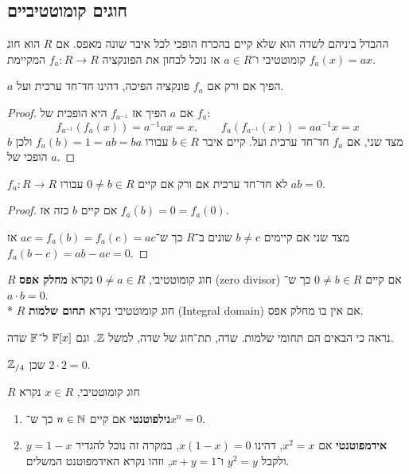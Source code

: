 \subsection{חוגים קומוטטיביים}
ההבדל ביניהם לשדה הוא שלא קיים בהכרח הופכי לכל איבר שונה מאפס.
אם $R$ הוא חוג קומוטטיבי ו־$a \in R$ אז נוכל לבחון את הפונקציה $f_a : R \to R$ המקיימת $f_a(x) = ax$.
\begin{lemma}
	$a$ הפיך אם ורק אם $f_a$ פונקציה הפיכה, דהינו חד־חד ערכית ועל.
\end{lemma}
\begin{proof}
	אם $a$ הפיך אז $f_{a^{-1}}$ היא הופכית של $f_a$:
	\[
		f_{a^{-1}}(f_a(x)) = a^{-1} a x = x,
		\qquad
		f_a(f_{a^{-1}}(x)) = a a^{-1} x = x
	\]
	מצד שני, אם $f_a$ חד־חד ערכית ועל. קיים איבר $b \in R$ עבורו $f_a(b) = 1 = ab = ba$ ולכן $b$ הופכי של $a$.
\end{proof}
\begin{lemma}
	$f_a : R \to R$ לא חד־חד ערכית אם ורק אם קיים $0 \ne b \in R$ עבורו $ab = 0$.
\end{lemma}
\begin{proof}
	אם קיים $b$ כזה אז $f_a(b) = 0 = f_a(0)$.

	מצד שני אם קיימים $b \ne c$ שונים ב־$R$ כך ש־$ac = f_a(b) = f_a(c) = ac$ אז $f_a(b - c) = ab - ac = 0$.
\end{proof}
\begin{definition}
	$R$ חוג קומוטטיבי, $0 \ne a \in R$ נקרא \textbf{מחלק אפס} (zero divisor) אם קיים $0 \ne b \in R$ כך ש־$a \cdot b = 0$. \\*
	$R$ חוג קומוטטיבי נקרא \textbf{תחום שלמות} (Integral domain) אם אין בו מחלק אפס.
\end{definition}
\begin{example}
	נראה כי הבאים הם תחומי שלמות.
	שדה, תת־חוג של שדה, למשל $\mathbb{Z}$. וגם $\mathbb{F}[x]$ ל־$\mathbb{F}$ שדה.
\end{example}
\begin{example}
	$\mathbb{Z}_{/4}$ שכן $2 \cdot 2 = 0$.
\end{example}
\begin{definition}
	$R$ חוג קומוטטיבי, $x \in R$ נקרא
	\begin{enumerate}
		\item \textbf{נילפוטנטי} אם קיים $n \in \mathbb{N}$ כך ש־$x^n = 0$.
		\item \textbf{אידמפוטנטי} אם $x^2 = x$, דהינו $x (1 - x) = 0$, במקרה זה נוכל להגדיר $y = 1 - x$ ולקבל $y^2 = y$ ו־$x + y = 1$, וזהו נקרא האידמפוטנט המשלים.
	\end{enumerate}
\end{definition}

